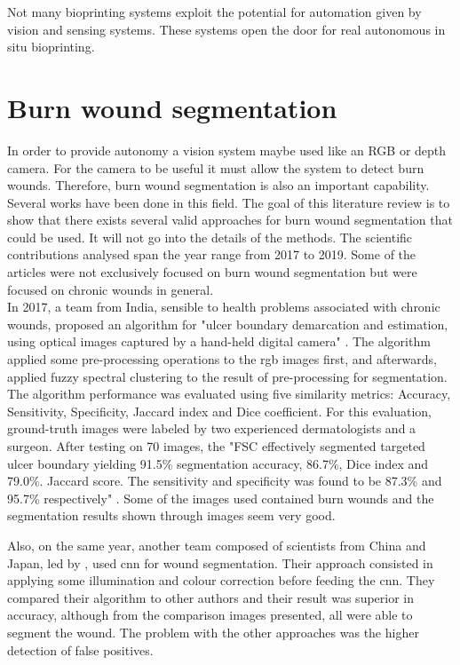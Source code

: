 Not many bioprinting systems exploit the potential for automation given by vision and sensing systems. These systems open the door for real autonomous in situ bioprinting.


\section{Burn wound segmentation}
\label{sec:burn_wound_segmentation}

In order to provide autonomy a vision system maybe used like an RGB or depth camera. For the camera to be useful it must allow the system to detect burn wounds. Therefore, burn wound segmentation is also an important capability. Several works have been done in this field. The goal of this literature review is to show that there exists several valid approaches for burn wound segmentation that could be used. It will not go into the details of the methods. The scientific contributions analysed span the year range from 2017 to 2019. Some of the articles were not exclusively focused on burn wound segmentation but were focused on chronic wounds in general.\\

In 2017, a team from India, sensible to health problems associated with chronic wounds, proposed an algorithm for "ulcer boundary demarcation and estimation, using optical images captured by a hand-held digital camera" \cite{ManoharDhane2017_fuzzy_spectral_clustering_chronic_wounds}. The algorithm applied some pre-processing operations to the \gls{rgb} images first, and afterwards, applied fuzzy spectral clustering to the result of pre-processing for segmentation. The algorithm performance was evaluated using five similarity metrics:
Accuracy, Sensitivity, Specificity, Jaccard index and Dice coefficient. For this evaluation, ground-truth images were labeled by two experienced dermatologists and a surgeon. After testing on 70 images, the "FSC effectively segmented targeted ulcer boundary yielding 91.5\% segmentation accuracy, 86.7\%, Dice index and 79.0\%. Jaccard score. The sensitivity and specificity was found to be 87.3\% and 95.7\% respectively" \cite{ManoharDhane2017_fuzzy_spectral_clustering_chronic_wounds}. Some of the images used contained burn wounds and the segmentation results shown through images seem very good.

Also, on the same year, another team composed of scientists from China and Japan, led by \citeauthor{Lu2017_wound_intensity_correction_segmentation_cnn}, used \gls{cnn} for wound segmentation. Their approach consisted in applying some illumination and colour correction before feeding the \gls{cnn}. They compared their algorithm to other authors and their result was superior in accuracy, although from the comparison images presented, all were able to segment the wound. The problem with the other approaches was the higher detection of false positives.\\


